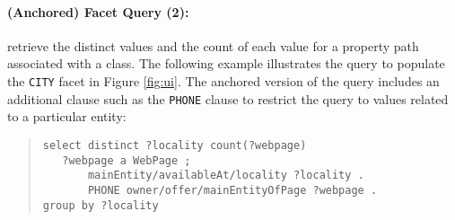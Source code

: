 \paragraph{(Anchored) Facet Query (2):} retrieve the distinct values and the count of each value for a property path associated with a class.
The following example illustrates the query to populate the \verb|CITY| facet in Figure \ref{fig:ui}.
The anchored version of the query includes an additional clause such as the \verb|PHONE| clause to restrict the query to values related to a particular entity:
{\footnotesize
\begin{quote}
\begin{verbatim}
select distinct ?locality count(?webpage)
   ?webpage a WebPage ;
       mainEntity/availableAt/locality ?locality . 
       PHONE owner/offer/mainEntityOfPage ?webpage .
group by ?locality
\end{verbatim}
\end{quote}}

